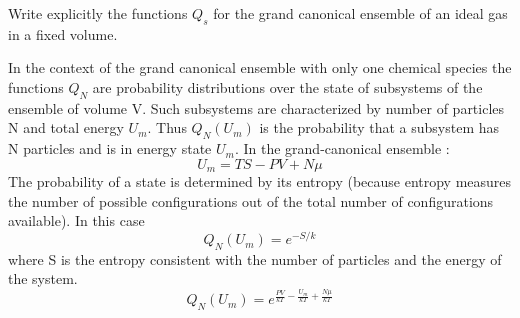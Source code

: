 

Write explicitly the functions $Q_s$ for the grand canonical ensemble of an ideal gas in a fixed volume.


In the context of the grand canonical ensemble with only one chemical species the functions $Q_N$ are probability distributions over the state of subsystems of the ensemble of volume V. Such subsystems are characterized by number of particles N and total energy $U_m$. Thus $Q_N(U_m)$ is the probability that a subsystem has N particles and is in energy state $U_m$. In the grand-canonical ensemble :
\begin{equation}
U_m =TS-PV+N\mu 
\end{equation}
The probability of a state is determined by its entropy (because entropy measures the number of possible configurations out of the total number of configurations available). In this case
\begin{equation}
Q_N(U_m)=e^{-S/k}
\end{equation}
where S is the entropy consistent with the number of particles and the energy of the system.
\begin{equation}
Q_N(U_m)=e^{{\displaystyle\frac{PV}{kT}}-{\displaystyle\frac{U_m}{kT}}+{\displaystyle\frac{N \mu}{kT}}}
\end{equation}